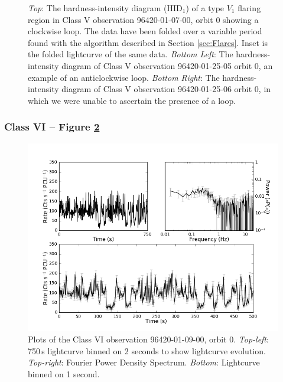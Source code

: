 \begin{figure}
    \captionsetup{singlelinecheck=off}
    \caption{\textit{Top}: The hardness-intensity diagram (HID$_1$) of a type $V_1$ flaring region in Class V observation 96420-01-07-00, orbit 0 showing a clockwise loop.  The data have been folded over a variable period found with the algorithm described in Section \ref{sec:Flares}.  Inset is the folded lightcurve of the same data. \textit{Bottom Left}: The hardness-intensity diagram of Class V observation 96420-01-25-05 orbit 0, an example of an anticlockwise loop.  \textit{Bottom Right}: The hardness-intensity diagram of Class V observation 96420-01-25-06 orbit 0, in which we were unable to ascertain the presence of a loop.}
   \label{fig:LoopV}
\end{figure}

\subsubsection{Class VI -- Figure \ref{fig:Lmulti}}

\begin{figure}
    \includegraphics[width=0.8\columnwidth, trim = 0.6cm 0 3.9cm 0]{images/Lmulti.png}
    \captionsetup{singlelinecheck=off}
    \caption{Plots of the Class VI observation 96420-01-09-00, orbit 0.  \textit{Top-left}: 750\,s lightcurve binned on 2 seconds to show lightcurve evolution.  \textit{Top-right}: Fourier Power Density Spectrum.  \textit{Bottom}: Lightcurve binned on 1 second.}
   \label{fig:Lmulti}
\end{figure}

